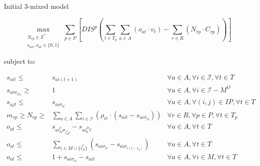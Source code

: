 \documentclass{beamer}
\begin{document}

\begin{frame}{Initial 3-mixed model}
\scriptsize

\begin{equation}
	\max_{\substack{N_{rp} \in \mathbb{Z}^* \\ 
	s_{ait}, o_{at} \in \{0, 1\}}} 
	\sum_{p \in P} [ DIS^p (\sum_{t\in T_p} \sum_{a \in A} (o_{at} \cdot v_t)  - \sum_{r\in R} (N_{rp} \cdot C_{rp})) ]
\end{equation}

\bigskip

subject to:

\begin{align}
s_{ait} \leq& s_{ai(t+1)}																	& \forall a \in A, \forall i \in \mathcal{I}, \forall t \in T	\\
s_{ai\sigma_{it_N}} \geq& 1																& \forall a \in A, \forall i \in \mathcal{I} - M^O		\\
s_{ajt} \leq& s_{ai\sigma_{it}}																& \forall a \in A, \forall (i, j) \in IP, \forall t \in T 	\\
m_{rp} \geq N_{rp} \geq& \sum_{a\in A} \sum_{i\in \mathcal{I}} (\rho_{ir} \cdot (s_{ait} - s_{ai\sigma_{it}})) 				& \forall r \in R, \forall p \in P, \forall t \in T_p 		\\
o_{at} \leq& s_{ai^I_N\sigma_{i^I_Nt}} - s_{ai^D_0t}												& \forall a \in A, \forall t \in T				\\
o_{at} \leq& \sum_{i \in M \cup \{i^I_N\}} (s_{ai\sigma_{it}} - s_{ai\sigma_{i(t-\lambda_a)}})						& \forall a \in A, \forall t \in T				\\
o_{at} \leq& 1 + s_{ai\sigma_{it}} - s_{ait}														& \forall a \in A, \forall i \in M, \forall t \in T		
\end{align}

\end{frame}
\end{document}
